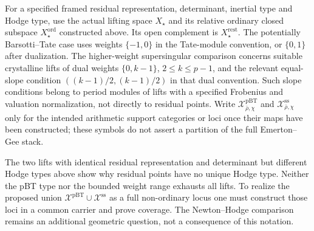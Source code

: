 \begin{definition}
\label{v4-arith:w6-e:def:non-ord-sub-loci}
For a specified framed residual representation, determinant, inertial
type and Hodge type, use the actual lifting space $X_\star$ and its
relative ordinary closed subspace $X_\star^{\mathrm{ord}}$ constructed
above. Its open complement is $X_\star^{\mathrm{rest}}$.
The potentially Barsotti--Tate case uses weights $\{-1,0\}$ in the
Tate-module convention, or $\{0,1\}$ after dualization. The higher-weight supersingular comparison concerns suitable
crystalline lifts of dual weights $\{0,k-1\}$, $2\le k\le p-1$,
and the relevant equal-slope condition
$((k-1)/2,(k-1)/2)$ in that dual convention. Such slope conditions
belong to period modules of lifts with a specified Frobenius and
valuation normalization, not directly to residual points.
Write $\mathcal X^{\mathrm{pBT}}_{\bar\rho,\chi}$ and
$\mathcal X^{\mathrm{ss}}_{\bar\rho,\chi}$ only for the intended
arithmetic support categories or loci once their maps have been
constructed; these symbols do not assert a partition of the full
Emerton--Gee stack.
\end{definition}
\begin{remark}
\label{v4-arith:w6-e:rem:non-ord-extent}
The two lifts with identical residual representation and determinant
but different Hodge types above show why residual points have no
unique Hodge type. Neither the pBT type nor the bounded weight range
exhausts all lifts. To realize the proposed union
$\mathcal X^{\mathrm{pBT}}\cup\mathcal X^{\mathrm{ss}}$ as a full
non-ordinary locus one must construct those loci in a common carrier
and prove coverage. The Newton--Hodge comparison remains an additional
geometric question, not a consequence of this notation.
\end{remark}

